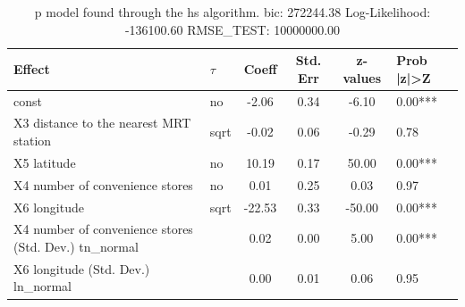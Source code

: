\begin{table}
	\caption{p model found through the hs algorithm. bic: 272244.38 Log-Likelihood: -136100.60 RMSE_TEST: 10000000.00}
	\begin{center}
		\begin{tabular}{|l|l|c|c|c|l|}
			\hline
			Effect & $\tau$ & Coeff & Std. Err & z-values & Prob |z|>Z \\
			\hline
			const & no & -2.06 & 0.34 & -6.10 & 0.00*** \\
			\hline
			X3 distance to the nearest MRT station & sqrt & -0.02 & 0.06 & -0.29 & 0.78 \\
			\hline
			X5 latitude & no & 10.19 & 0.17 & 50.00 & 0.00*** \\
			\hline
			X4 number of convenience stores & no & 0.01 & 0.25 & 0.03 & 0.97 \\
			\hline
			X6 longitude & sqrt & -22.53 & 0.33 & -50.00 & 0.00*** \\
			\hline
			X4 number of convenience stores (Std. Dev.) tn_normal &  & 0.02 & 0.00 & 5.00 & 0.00*** \\
			\hline
			X6 longitude (Std. Dev.) ln_normal &  & 0.00 & 0.01 & 0.06 & 0.95 \\
			\hline
		\end{tabular}
	\end{center}
\end{table}